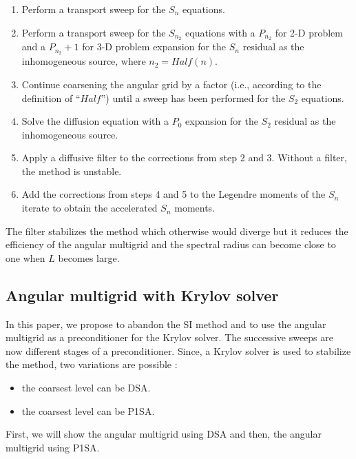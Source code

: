\begin{enumerate}
\item Perform a transport sweep for the $S_n$ equations.
\item Perform a transport sweep for the $S_{n_2}$ equations with a $P_{n_2}$
for 2-D problem and a $P_{n_2}+1$ for 3-D problem expansion for the $S_n$
residual as the inhomogeneous source, where $n_2=Half(n)$.
\item Continue coarsening the angular grid by a factor (i.e., according to the
definition of ``$Half$'') until a sweep has been performed for the $S_2$
equations.
\item Solve the diffusion equation with a $P_0$ expansion for the $S_2$
residual as the inhomogeneous source. 
\item Apply a diffusive filter to the corrections from step 2 and 3. Without a
filter, the method is unstable.
\item Add the corrections from steps 4 and 5 to the Legendre moments of the
$S_n$ iterate to obtain the accelerated $S_n$ moments.
\end{enumerate}
The filter stabilizes the method which otherwise would diverge but it reduces
the efficiency of the angular multigrid and the spectral radius can become
close to one when $L$ becomes large.
\subsection{Angular multigrid with Krylov solver}
In this paper, we propose to abandon the SI method and to use the angular
multigrid as a preconditioner for the Krylov solver. The successive sweeps are
now different stages of a preconditioner. Since, a Krylov solver is used to
stabilize the method, two variations are possible :
\begin{itemize}
\item the coarsest level can be DSA.
\item the coarsest level can be P1SA.
\end{itemize}
First, we will show the angular multigrid using DSA and then, the angular
multigrid using P1SA.
